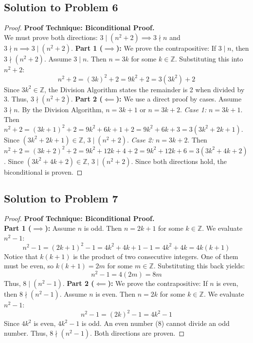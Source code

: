 \documentclass[12pt]{article}
\begin{document}
\subsection{Solution to Problem 6}
\begin{proof}
\textbf{Proof Technique: Biconditional Proof.} \\
We must prove both directions: $3 \mid (n^2 + 2) \implies 3 \nmid n$ and $3 \nmid n \implies 3 \mid (n^2 + 2)$.
\textbf{Part 1 ($\implies$):} We prove the contrapositive: If $3 \mid n$, then $3 \nmid (n^2 + 2)$. Assume $3 \mid n$. Then $n = 3k$ for some $k \in \mathbb{Z}$. Substituting this into $n^2 + 2$:
\[ n^2 + 2 = (3k)^2 + 2 = 9k^2 + 2 = 3(3k^2) + 2 \]
Since $3k^2 \in \mathbb{Z}$, the Division Algorithm states the remainder is 2 when divided by 3. Thus, $3 \nmid (n^2 + 2)$.
\textbf{Part 2 ($\impliedby$):} We use a direct proof by cases. Assume $3 \nmid n$. By the Division Algorithm, $n = 3k + 1$ or $n = 3k + 2$.
\textit{Case 1:} $n = 3k + 1$. Then $n^2 + 2 = (3k + 1)^2 + 2 = 9k^2 + 6k + 1 + 2 = 9k^2 + 6k + 3 = 3(3k^2 + 2k + 1)$. Since $(3k^2 + 2k + 1) \in \mathbb{Z}$, $3 \mid (n^2 + 2)$.
\textit{Case 2:} $n = 3k + 2$. Then $n^2 + 2 = (3k + 2)^2 + 2 = 9k^2 + 12k + 4 + 2 = 9k^2 + 12k + 6 = 3(3k^2 + 4k + 2)$. Since $(3k^2 + 4k + 2) \in \mathbb{Z}$, $3 \mid (n^2 + 2)$.
Since both directions hold, the biconditional is proven.
\end{proof}

\subsection{Solution to Problem 7}
\begin{proof}
\textbf{Proof Technique: Biconditional Proof.} \\
\textbf{Part 1 ($\implies$):} Assume $n$ is odd. Then $n = 2k + 1$ for some $k \in \mathbb{Z}$. We evaluate $n^2 - 1$:
\[ n^2 - 1 = (2k + 1)^2 - 1 = 4k^2 + 4k + 1 - 1 = 4k^2 + 4k = 4k(k + 1) \]
Notice that $k(k + 1)$ is the product of two consecutive integers. One of them must be even, so $k(k + 1) = 2m$ for some $m \in \mathbb{Z}$. Substituting this back yields:
\[ n^2 - 1 = 4(2m) = 8m \]
Thus, $8 \mid (n^2 - 1)$.
\textbf{Part 2 ($\impliedby$):} We prove the contrapositive: If $n$ is even, then $8 \nmid (n^2 - 1)$. Assume $n$ is even. Then $n = 2k$ for some $k \in \mathbb{Z}$. We evaluate $n^2 - 1$:
\[ n^2 - 1 = (2k)^2 - 1 = 4k^2 - 1 \]
Since $4k^2$ is even, $4k^2 - 1$ is odd. An even number (8) cannot divide an odd number. Thus, $8 \nmid (n^2 - 1)$.
Both directions are proven.
\end{proof}
\end{document}
